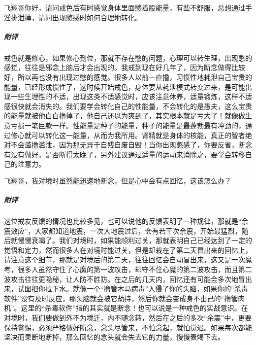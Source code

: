 \begin{case}
    飞翔哥你好，请问戒色后有时感觉身体里面憋着股能量，有些不舒服，总想通过手淫排泄掉，请问出现憋感时如何合理地转化。
    \subparagraph{附评} 戒色就是修心，如果修心到位，那就不存在憋的问题，心理可以转生理，出现憋的感觉，往往是邪念上脑后才会出现的。我戒到现在好几年了，因为断念做得比较好，所以再也没有出现过憋的感觉。很多人以前一直撸，习惯性地耗泄自己宝贵的能量，已经形成惯性了，这时候开始戒色，身体要从耗泄模式转变过来，是可能出现一些生理性的不适，出现这类不适感觉时，应该注意休养，适量锻炼，这样不适感很快就会消失的。我们要学会转化自己的性能量，不会转化的是愚夫，这么宝贵的能量就被他白白撸掉了，他自己还以为爽到了，其实根本就是亏大了！就像做生意亏损一笔巨款一样。性能量是种子的能量，种子的能量是最蓬勃最有冲劲的，通过修心就可以转化这一能量，从而为我所用。肾精就是身体的核能，真正的智者绝对不会滥撸滥泄，因为那无异于自残自废自毁！当你出现憋感了，你要反省，断念有没有做好，是否断得太晚了，另外建议通过适量的运动来消除之，要学会转移自己的注意力。
\end{case}

\begin{case}
    飞翔哥，我对境时虽然能迅速地断念，但是心中会有点回忆，这该怎么办？
    \subparagraph{附评} 这位戒友反馈的情况也比较多见，也可以说他的反馈表明了一种规律，那就是“余震效应”，大家都知道地震，一次大地震过后，会有若干次余震，开始最猛烈，随后就慢慢衰竭了。我们对境时，如果能顺利过关，那就表明自己已经达到了一定的觉悟和定力，然而很多人在对境时能过关，但是却栽在了第二天冒出来的回忆上，请注意这个细节，那就是对境后的第二天，往往回忆会自动冒出来，这又是一次魔考，很多人虽然守住了心魔的第一波攻击，却守不住心魔的第二波攻击，而且第二波攻击往往更隐秘，让人防不胜防。在之后的几天内，回忆还有可能会多次地冒出来，试图把你拉下水。就像一个“撸管木马病毒”入侵了你的头脑，如果你的“杀毒软件”没有及时反应，那头脑就会被它劫持，然后你就会变成身不由己的“撸管肉机”。这里的“杀毒软件”指的其实就是断念！也可以说是一种戒色的实战意识。在对境时，我们要做到外不为境迁，内不随念转，然后在之后的多次“余震”中，更要保持警惕，必须严格做好断念，念头尽管来，不怕念起，就怕觉迟。如果每次都能坚决而果断地断掉，那么回忆的念头就会失去它的力量，慢慢衰竭下去。
\end{case}


